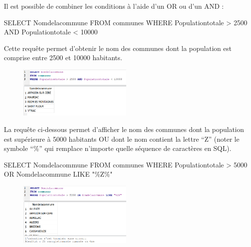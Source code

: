 \documentclass[
  a4paper,
  DIV=11,
  numbers=noendperiod]{scrartcl}
\newenvironment{Shaded}{\begin{snugshade}}{\end{snugshade}}
\newcommand{\DecValTok}[1]{\textcolor[rgb]{0.68,0.00,0.00}{#1}}
\newcommand{\KeywordTok}[1]{\textcolor[rgb]{0.00,0.23,0.31}{#1}}
\newcommand{\NormalTok}[1]{\textcolor[rgb]{0.00,0.23,0.31}{#1}}
\newcommand{\OperatorTok}[1]{\textcolor[rgb]{0.37,0.37,0.37}{#1}}
\newcommand{\OtherTok}[1]{\textcolor[rgb]{0.00,0.23,0.31}{#1}}
\begin{document}
Il est possible de combiner les conditions à l'aide d'un OR ou d'un AND
:

\begin{Shaded}
\begin{Highlighting}[]
\KeywordTok{SELECT}\NormalTok{ Nomdelacommune}
\KeywordTok{FROM}\NormalTok{ communes}
\KeywordTok{WHERE}\NormalTok{ Populationtotale }\OperatorTok{\textgreater{}} \DecValTok{2500} \KeywordTok{AND}\NormalTok{ Populationtotale }\OperatorTok{\textless{}} \DecValTok{10000}
\end{Highlighting}
\end{Shaded}

Cette requête permet d'obtenir le nom des communes dont la population
est comprise entre 2500 et 10000 habitants.

\begin{figure}

{\centering \includegraphics[width=0.5\textwidth,height=\textheight]{SQL3.png}

}

\end{figure}

La requête ci-dessous permet d'afficher le nom des communes dont la
population est supérieure à 5000 habitants OU dont le nom contient la
lettre ``Z'' (noter le symbole ``\%'' qui remplace n'importe quelle
séquence de caractères en SQL).

\begin{Shaded}
\begin{Highlighting}[]
\KeywordTok{SELECT}\NormalTok{ Nomdelacommune}
\KeywordTok{FROM}\NormalTok{ communes}
\KeywordTok{WHERE}\NormalTok{ Populationtotale }\OperatorTok{\textgreater{}} \DecValTok{5000} \KeywordTok{OR}\NormalTok{ Nomdelacommune }\KeywordTok{LIKE} \OtherTok{"\%Z\%"}
\end{Highlighting}
\end{Shaded}

\begin{figure}

{\centering \includegraphics[width=0.5\textwidth,height=\textheight]{SQL4.png}

}

\end{figure}
\end{document}
